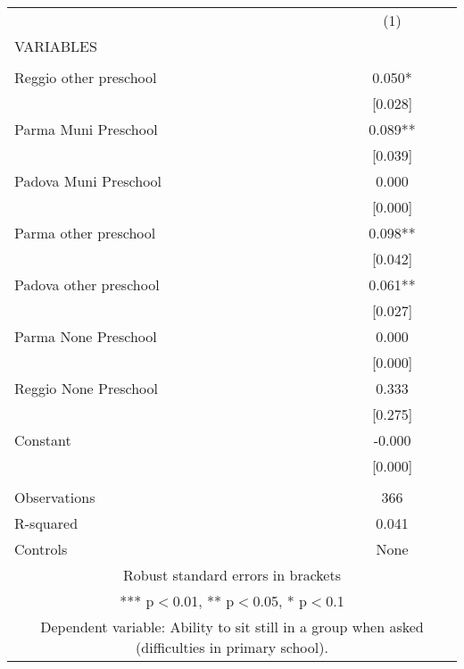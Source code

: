 \begin{tabular}{lc} \hline
 & (1) \\
VARIABLES &  \\ \hline
 &  \\
Reggio other preschool & 0.050* \\
 & [0.028] \\
Parma Muni Preschool & 0.089** \\
 & [0.039] \\
Padova Muni Preschool & 0.000 \\
 & [0.000] \\
Parma other preschool & 0.098** \\
 & [0.042] \\
Padova other preschool & 0.061** \\
 & [0.027] \\
Parma None Preschool & 0.000 \\
 & [0.000] \\
Reggio None Preschool & 0.333 \\
 & [0.275] \\
Constant & -0.000 \\
 & [0.000] \\
 &  \\
Observations & 366 \\
R-squared & 0.041 \\
 Controls & None \\ \hline
\multicolumn{2}{c}{ Robust standard errors in brackets} \\
\multicolumn{2}{c}{ *** p$<$0.01, ** p$<$0.05, * p$<$0.1} \\
\multicolumn{2}{c}{ Dependent variable: Ability to sit still in a group when asked (difficulties in primary school).} \\
\end{tabular}
